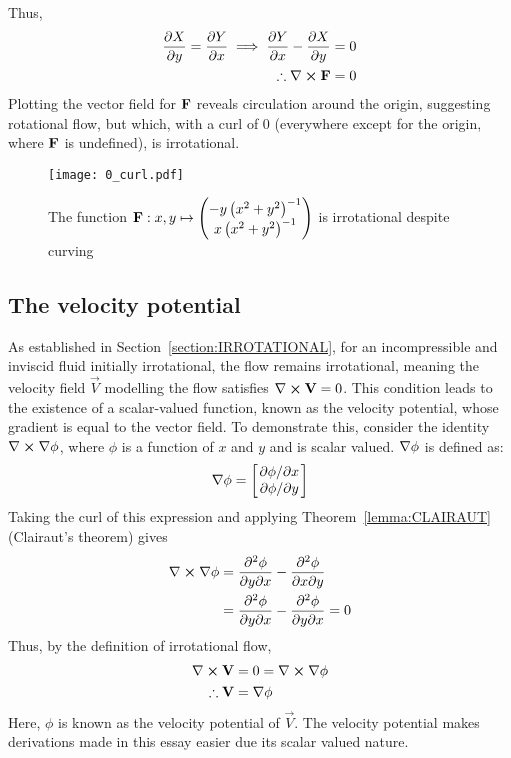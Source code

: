 Thus,
\begin{align*}
    \pdv{X}{y}=\pdv{Y}{x}\implies\pdv{Y}{x}-\pdv{X}{y}=0\\
    \therefore\curl{\fatf}=0
\end{align*}
Plotting the vector field for $\mathbf{F}$ reveals circulation around the origin, suggesting rotational flow, but which, with a curl of 0 (everywhere except for
the origin, where $\mathbf{F}$ is undefined), is irrotational.
\begin{figure*}[!ht]
    \texttt{[image: 0\_curl.pdf]}
    \centering
    \caption{The function $\mathbf{F}:x,y\mapsto\begin{pmatrix}
        -y\left(x^2+y^2\right)^{-1}\\x\left(x^2+y^2\right)^{-1}
    \end{pmatrix}$ is irrotational despite curving}
    \label{figure:ZEROCURL}
\end{figure*}


\newpage %
\subsection{The velocity potential}\label{section:POTENTIAL}
As established in Section~\ref{section:IRROTATIONAL}, for an incompressible and inviscid fluid initially irrotational, the flow remains irrotational, meaning
the velocity field $\vec{V}$ modelling the flow satisfies $\curl{\vec{V}}=0$. This condition leads to the existence of a scalar-valued function, known as the
velocity potential, whose gradient is equal to the vector field. To demonstrate this, consider the identity $\curl{\gradient{\phi}}$, where $\phi$ is a
function of $x$ and $y$ and is scalar valued. $\nabla\phi$ is defined as:
$$
    \nabla\phi=\begin{bmatrix}
        \pdv*{\phi}{x}\\
        \pdv*{\phi}{y}
    \end{bmatrix}
$$
Taking the curl of this expression and applying Theorem~\ref{lemma:CLAIRAUT} (Clairaut's theorem) gives
\begin{align*}
    \curl{\gradient{\phi}}&=\pdv{\phi}{y}{x}-\pdv{\phi}{x}{y}\\
                             &=\pdv{\phi}{y}{x}-\pdv{\phi}{y}{x}=0
\end{align*}
Thus, by the definition of irrotational flow,
\begin{align*}
    \curl{\vec{V}}&=0=\curl{\gradient{\phi}}\\
    \therefore\vec{V}&=\gradient{\phi}
\end{align*}
Here, $\phi$ is known as the velocity potential of $\vec{V}$. The velocity potential makes derivations made in this essay easier due its scalar valued nature.

